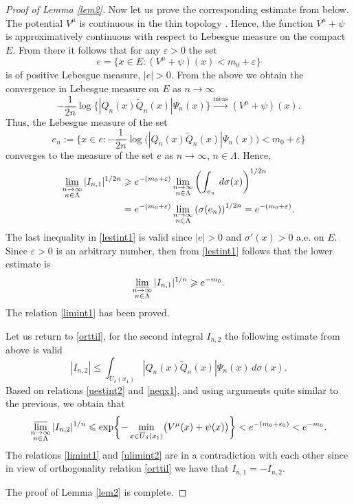 \documentclass[11pt, a4paper, twoside]{article}
\def\({\left(}
\def\){\right)}
\let\leq\leqslant
\let\geq\geqslant
\let\myt\widetilde
\let\myo\overline
\let\eps\varepsilon
\def\meas{\operatorname{meas}}
\theoremstyle{plain}
\theoremstyle{definition}
\begin{document}
\begin{proof}[Proof of Lemma \ref{lem2}]
Now let us prove the corresponding estimate from below.
The potential $V^\mu$ is continuous in the thin topology \cite[Chapter 5, \S 3]{Lan66}.
Hence, the function $V^\mu+\psi$ is approximatively continuous with respect
to Lebesgue measure on the compact $E$. From there it follows that  for any $\eps>0$ the set
$$
e=\{x\in E: (V^\mu+\psi)(x)<m_0+\eps\}
$$
is of positive Lebesgue measure, $|e|>0$. From the above we obtain the convergence in Lebesgue measure on $E$ as $n\to\infty$
$$
-\frac1{2n}\log
\bigl\{|Q_{n}(x)\myt{Q}_n(x)|\Psi_n(x)\bigr\}
\overset{\meas}\longrightarrow
(V^\mu+\psi)(x).
$$
Thus, the Lebesgue measure of the set
$$
e_n:=\biggl\{x\in e:-\frac1{2n}\log
\bigl(|Q_{n}(x)\myt{Q}_n(x)|\Psi_n(x)\bigr)
<m_0+\eps\biggr\}
$$
converges to the measure of the set $e$ as $n\to\infty$, $n\in\Lambda$. Hence,
\begin{align}
\varliminf_{\substack{n\to\infty\\n\in\Lambda}} |I_{n,1}|^{1/2n}
&\geq e^{-(m_0+\eps)}\lim_{\substack{n\to\infty\\n\in\Lambda}}
\(\int_{e_n}\,d\sigma(x)\)^{1/2n}\nonumber\\
&= e^{-(m_0+\eps)}\lim_{\substack{n\to\infty\\n\in\Lambda}}
\(\sigma(e_n)\)^{1/2n}=e^{-(m_0+\eps)}.
\label{lestint1}
\end{align}
The last inequality in \eqref{lestint1} is valid since $|e|>0$ and $\sigma'(x)>0$ a.e. on $E$.
Since $\eps>0$ is an arbitrary number, then from \eqref{lestint1} follows that the lower estimate is
$$
\varliminf_{\substack{n\to\infty\\n\in\Lambda}} |I_{n,1}|^{1/n}
\geq e^{-m_0}.
$$
The relation \eqref{limint1} has been proved. 

Let us return to \eqref{orttil}, for the second integral $I_{n,2}$ the following estimate from above is valid
\begin{equation}
|I_{n,2}|\leq
\int_{\myo{U}_\delta(x_1)}
|Q_n(x)\myt{Q}_n(x)|\Psi_n(x)\,d\sigma(x).
\label{uestint2}
\end{equation} 
Based on relations \eqref{uestint2} and \eqref{neqx1}, and using arguments quite similar to the previous, we obtain that
\begin{equation}
\varlimsup_{\substack{n\to\infty\\n\in\Lambda}} |I_{n,2}|^{1/n}
\leq\exp\biggl\{-\min_{x\in \myo{U}_\delta(x_1)}
\bigl(V^\mu(x)+\psi(x)\bigr)
\biggr\}<e^{-(m_0+\eps_0)}<e^{-m_0}.
\label{ulimint2}
\end{equation}
The relations \eqref{limint1} and \eqref{ulimint2} are in a contradiction with each other since in view of orthogonality relation \eqref{orttil} we have that $I_{n,1}=-I_{n,2}$. 

The proof of Lemma \ref{lem2} is complete.
\end{proof}
\end{document}
